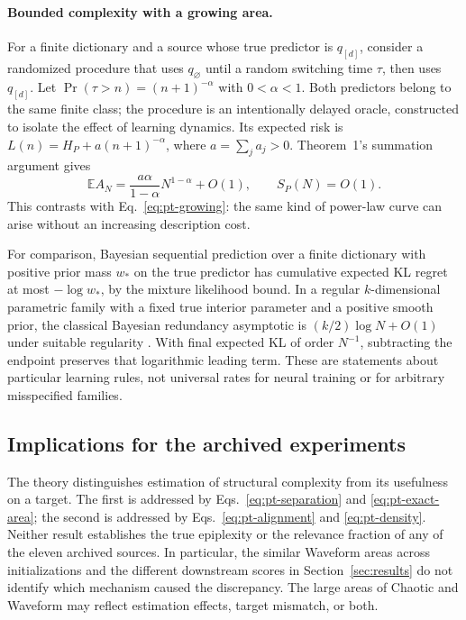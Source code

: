 \documentclass[10pt,a4paper]{article}
\theoremstyle{definition}
\begin{document}
\paragraph{Bounded complexity with a growing area.}
For a finite dictionary and a source whose true predictor is
$q_{[d]}$, consider a randomized procedure that uses $q_\varnothing$
until a random switching time $\tau$, then uses $q_{[d]}$.
Let $\Pr(\tau>n)=(n+1)^{-\alpha}$ with $0<\alpha<1$.
Both predictors belong to the same finite class; the procedure is
an intentionally delayed oracle, constructed to isolate the
effect of learning dynamics. Its expected risk is
$L(n)=H_P+a(n+1)^{-\alpha}$, where $a=\sum_j a_j>0$.
Theorem~1's summation argument gives
\[
 \mathbb E A_N=\frac{a\alpha}{1-\alpha}N^{1-\alpha}+O(1),
 \qquad S_P(N)=O(1).
\]
This contrasts with Eq.~\eqref{eq:pt-growing}: the same kind of
power-law curve can arise without an increasing description cost.

For comparison, Bayesian sequential prediction over a finite
dictionary with positive prior mass $w_*$ on the true predictor
has cumulative expected KL regret at most $-\log w_*$, by the
mixture likelihood bound. In a regular $k$-dimensional
parametric family with a fixed true interior parameter and a
positive smooth prior, the classical Bayesian redundancy
asymptotic is $(k/2)\log N+O(1)$ under suitable regularity
\cite{clarke1990}. With final expected KL of order $N^{-1}$,
subtracting the endpoint preserves that logarithmic leading term.
These are statements about particular learning rules, not universal
rates for neural training or for arbitrary misspecified families.

\subsection{Implications for the archived experiments}
\label{sec:pt-implications}

The theory distinguishes estimation of structural complexity from
its usefulness on a target. The first is addressed by
Eqs.~\eqref{eq:pt-separation} and \eqref{eq:pt-exact-area}; the
second is addressed by Eqs.~\eqref{eq:pt-alignment} and
\eqref{eq:pt-density}. Neither result establishes the true
epiplexity or the relevance fraction of any of the eleven
archived sources. In particular, the similar Waveform areas across
initializations and the different downstream scores in
Section~\ref{sec:results} do not identify which mechanism caused
the discrepancy. The large areas of Chaotic and Waveform may
reflect estimation effects, target mismatch, or both.
\end{document}
